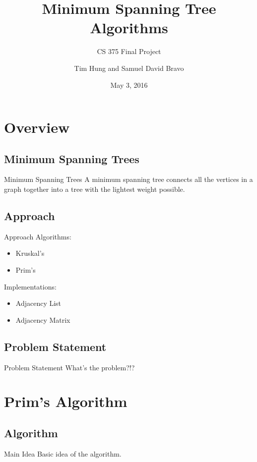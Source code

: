\documentclass{beamer}
\title{Minimum Spanning Tree Algorithms}
\subtitle{CS 375 Final Project}
\author{Tim Hung and Samuel David Bravo}
\institute{Binghamton University}
\date{May 3, 2016}
\begin{document}
\frame{\titlepage}
\section{Overview}\frame{\sectionpage}

\subsection{Minimum Spanning Trees}
\begin{frame}{Minimum Spanning Trees}
    A minimum spanning tree connects all the vertices in a graph together into
    a tree with the lightest weight possible.
\end{frame}

\subsection{Approach}
\begin{frame}{Approach}
    Algorithms:

        \begin{itemize}
        \item Kruskal's
        \item Prim's
        \end{itemize}

    Implementations:

        \begin{itemize}
        \item Adjacency List
        \item Adjacency Matrix
        \end{itemize}
\end{frame}

\subsection{Problem Statement}
\begin{frame}{Problem Statement}
    What's the problem?!?
\end{frame}


\section{Prim's Algorithm}\frame{\sectionpage}
\subsection{Algorithm}
\begin{frame}{Main Idea}
    Basic idea of the algorithm.
\end{frame}
\end{document}
